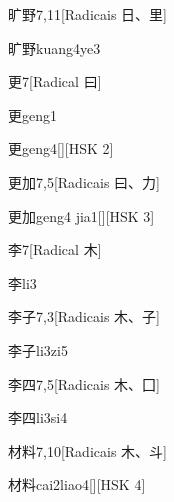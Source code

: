\begin{entry}{旷野}{7,11}[Radicais ⽇、⾥]
  \begin{phonetics}{旷野}{kuang4ye3}
  \end{phonetics}
\end{entry}

\begin{entry}{更}{7}[Radical ⽈]
  \begin{phonetics}{更}{geng1}
  \end{phonetics}
  \begin{phonetics}{更}{geng4}[][HSK 2]
  \end{phonetics}
\end{entry}

\begin{entry}{更加}{7,5}[Radicais ⽈、⼒]
  \begin{phonetics}{更加}{geng4 jia1}[][HSK 3]
  \end{phonetics}
\end{entry}

\begin{entry}{李}{7}[Radical ⽊]
  \begin{phonetics}{李}{li3}
  \end{phonetics}
\end{entry}

\begin{entry}{李子}{7,3}[Radicais ⽊、⼦]
  \begin{phonetics}{李子}{li3zi5}
  \end{phonetics}
\end{entry}

\begin{entry}{李四}{7,5}[Radicais ⽊、⼞]
  \begin{phonetics}{李四}{li3si4}
  \end{phonetics}
\end{entry}

\begin{entry}{材料}{7,10}[Radicais ⽊、⽃]
  \begin{phonetics}{材料}{cai2liao4}[][HSK 4]
  \end{phonetics}
\end{entry}

